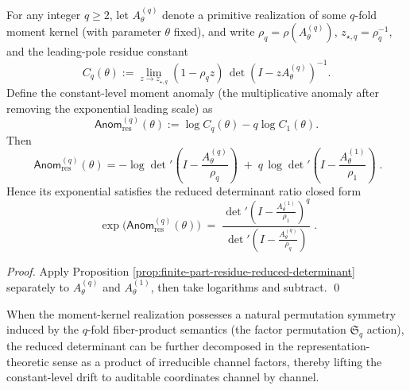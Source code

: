 \begin{corollary}\label{cor:finite-part-moment-anomaly-reduced-determinant-ratio}
For any integer \(q\ge 2\), let \(A^{(q)}_\theta\) denote a primitive realization of some \(q\)-fold moment kernel (with parameter \(\theta\) fixed), and write
\(
\rho_q=\rho(A^{(q)}_\theta)
\),
\(
z_{\star,q}=\rho_q^{-1}
\), and the leading-pole residue constant
\[
C_q(\theta):=\lim_{z\to z_{\star,q}}(1-\rho_q z)\,\det(I-zA^{(q)}_\theta)^{-1}.
\]
Define the constant-level moment anomaly (the multiplicative anomaly after removing the exponential leading scale) as
\[
\mathsf{Anom}^{(q)}_{\mathrm{res}}(\theta):=\log C_q(\theta)-q\log C_1(\theta).
\]
Then
\[
\boxed{\;
\mathsf{Anom}^{(q)}_{\mathrm{res}}(\theta)
=
-\log\det\nolimits'\!\left(I-\frac{A^{(q)}_\theta}{\rho_q}\right)
\;+\;
q\,\log\det\nolimits'\!\left(I-\frac{A^{(1)}_\theta}{\rho_1}\right)\; }.
\]
Hence its exponential satisfies the reduced determinant ratio closed form
\[
\boxed{\;
\exp\bigl(\mathsf{Anom}^{(q)}_{\mathrm{res}}(\theta)\bigr)
\;=\;
\frac{\det\nolimits'\!\left(I-\frac{A^{(1)}_\theta}{\rho_1}\right)^{q}}
{\det\nolimits'\!\left(I-\frac{A^{(q)}_\theta}{\rho_q}\right)}\; }.
\]
\end{corollary}
\begin{proof}
Apply Proposition \ref{prop:finite-part-residue-reduced-determinant} separately to \(A^{(q)}_\theta\) and \(A^{(1)}_\theta\),
then take logarithms and subtract. \qed
\end{proof}

When the moment-kernel realization possesses a natural permutation symmetry induced by the \(q\)-fold fiber-product semantics (the factor permutation \(\mathfrak{S}_q\) action),
the reduced determinant can be further decomposed in the representation-theoretic sense as a product of irreducible channel factors, thereby lifting the constant-level drift to auditable coordinates channel by channel.


